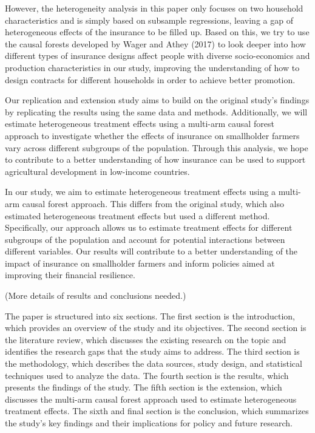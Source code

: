 \documentclass[AER]{AEA}
\begin{document}
However, the heterogeneity analysis in this paper only focuses on two
household characteristics and is simply based on subsample regressions,
leaving a gap of heterogeneous effects of the insurance to be filled up.
Based on this, we try to use the causal forests developed by Wager and
Athey (2017) to look deeper into how different types of insurance
designs affect people with diverse socio-economics and production
characteristics in our study, improving the understanding of how to
design contracts for different households in order to achieve better
promotion.

Our replication and extension study aims to build on the original
study's findings by replicating the results using the same data and
methods. Additionally, we will estimate heterogeneous treatment effects
using a multi-arm causal forest approach to investigate whether the
effects of insurance on smallholder farmers vary across different
subgroups of the population. Through this analysis, we hope to
contribute to a better understanding of how insurance can be used to
support agricultural development in low-income countries.

In our study, we aim to estimate heterogeneous treatment effects using a
multi-arm causal forest approach. This differs from the original study,
which also estimated heterogeneous treatment effects but used a
different method. Specifically, our approach allows us to estimate
treatment effects for different subgroups of the population and account
for potential interactions between different variables. Our results will
contribute to a better understanding of the impact of insurance on
smallholder farmers and inform policies aimed at improving their
financial resilience.

(More details of results and conclusions needed.)

The paper is structured into six sections. The first section is the
introduction, which provides an overview of the study and its
objectives. The second section is the literature review, which discusses
the existing research on the topic and identifies the research gaps that
the study aims to address. The third section is the methodology, which
describes the data sources, study design, and statistical techniques
used to analyze the data. The fourth section is the results, which
presents the findings of the study. The fifth section is the extension,
which discusses the multi-arm causal forest approach used to estimate
heterogeneous treatment effects. The sixth and final section is the
conclusion, which summarizes the study's key findings and their
implications for policy and future research.
\end{document}
